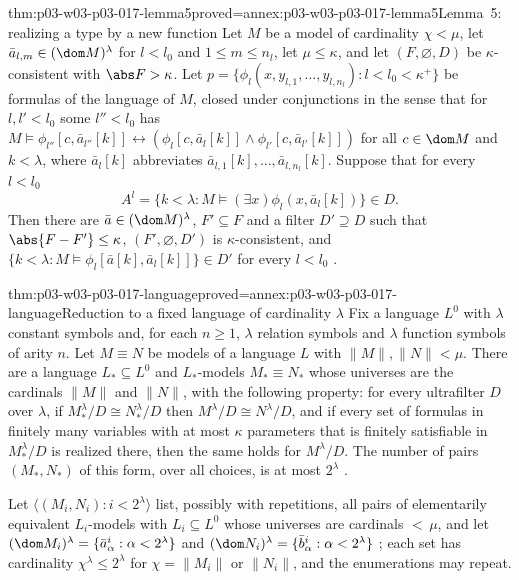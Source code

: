\begin{hblemma}{thm:p03-w03-p03-017-lemma5}{proved=annex:p03-w03-p03-017-lemma5}{Lemma~5: realizing a type by a new function}
Let \(M\) be a model of cardinality \(\chi<\mu\), let
\(\bar a_{l,m}\in(\dom M)^\lambda\) for \(l<l_0\) and \(1\le m\le n_l\), let
\(\mu\le\kappa\), and let \((F,\varnothing,D)\) be \(\kappa\)-consistent with
\(\abs F>\kappa\).  Let
\(p=\{\phi_l(x,y_{l,1},\ldots,y_{l,n_l}):l<l_0<\kappa^+\}\) be formulas of
the language of \(M\), closed under conjunctions in the sense that for
\(l,l'<l_0\) some \(l''<l_0\) has
\(M\models\phi_{l''}[c,\bar a_{l''}[k]]\leftrightarrow
(\phi_l[c,\bar a_l[k]]\wedge\phi_{l'}[c,\bar a_{l'}[k]])\) for all
\(c\in\dom M\) and \(k<\lambda\), where \(\bar a_l[k]\) abbreviates
\(\bar a_{l,1}[k],\ldots,\bar a_{l,n_l}[k]\).  Suppose that for every
\(l<l_0\)
\[
  A^l=\{k<\lambda:M\models(\exists x)\phi_l(x,\bar a_l[k])\}\in D.
\]
Then there are \(\bar a\in(\dom M)^\lambda\), \(F'\subseteq F\) and a filter
\(D'\supseteq D\) such that \(\abs{F-F'}\le\kappa\), \((F',\varnothing,D')\)
is \(\kappa\)-consistent, and
\(\{k<\lambda:M\models\phi_l[\bar a[k],\bar a_l[k]]\}\in D'\) for every
\(l<l_0\) \cite[p.~229, Lemma~5]{Shelah1971Ultrapowers}.
\end{hblemma}

\begin{hblemma}{thm:p03-w03-p03-017-language}{proved=annex:p03-w03-p03-017-language}{Reduction to a fixed language of cardinality \(\lambda\)}
Fix a language \(L^0\) with \(\lambda\) constant symbols and, for each
\(n\ge1\), \(\lambda\) relation symbols and \(\lambda\) function symbols of
arity \(n\).  Let \(M\equiv N\) be models of a language \(L\) with
\(\lVert M\rVert,\lVert N\rVert<\mu\).  There are a language
\(L_*\subseteq L^0\) and \(L_*\)-models \(M_*\equiv N_*\) whose universes are
the cardinals \(\lVert M\rVert\) and \(\lVert N\rVert\), with the following
property: for every ultrafilter \(D\) over \(\lambda\), if
\(M_*^\lambda/D\cong N_*^\lambda/D\) then \(M^\lambda/D\cong N^\lambda/D\),
and if every set of formulas in finitely many variables with at most
\(\kappa\) parameters that is finitely satisfiable in \(M_*^\lambda/D\) is
realized there, then the same holds for \(M^\lambda/D\).  The number of pairs \((M_*,N_*)\) of this form, over all
choices, is at most \(2^\lambda\)
\cite[p.~230]{Shelah1971Ultrapowers}.
\end{hblemma}

Let \(\langle(M_i,N_i):i<2^\lambda\rangle\) list, possibly with repetitions,
all pairs of elementarily equivalent \(L_i\)-models with \(L_i\subseteq L^0\)
whose universes are cardinals \({<}\,\mu\), and let
\((\dom M_i)^\lambda=\{\bar a^i_\alpha:\alpha<2^\lambda\}\) and
\((\dom N_i)^\lambda=\{\bar b^i_\alpha:\alpha<2^\lambda\}\)
\cite[p.~230]{Shelah1971Ultrapowers}; each set has cardinality
\(\chi^\lambda\le2^\lambda\) for \(\chi=\lVert M_i\rVert\) or
\(\lVert N_i\rVert\), and the enumerations may repeat.

